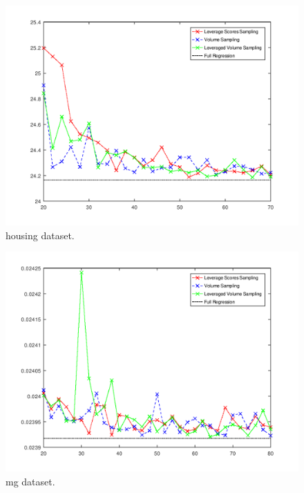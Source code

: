 \documentclass{article}
\begin{document}
        \begin{figure}
            \includegraphics[width=\linewidth]{results/housing.png}
            \caption{housing dataset.}
            \label{fig:dataset1}
        \end{figure}
        \begin{figure}
            \includegraphics[width=\linewidth]{results/mg.png}
            \caption{mg dataset.}
            \label{fig:dataset1}
        \end{figure}
\end{document}
